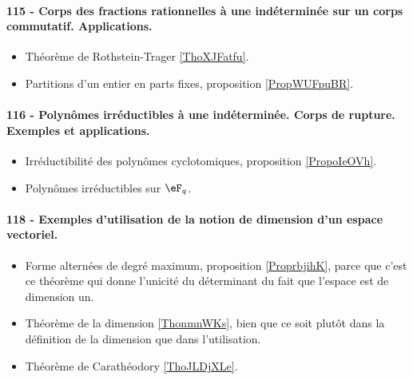 \paragraph{115 - Corps des fractions rationnelles à une indéterminée sur un corps commutatif. Applications.}
\begin{itemize}
    \item Théorème de Rothstein-Trager \ref{ThoXJFatfu}.
    \item Partitions d'un entier en parts fixes, proposition \ref{PropWUFpuBR}.
\end{itemize}

\paragraph{116 - Polynômes irréductibles à une indéterminée. Corps de rupture. Exemples et applications.}
\begin{itemize}
    \item Irréductibilité des polynômes cyclotomiques, proposition \ref{PropoIeOVh}.
    \item Polynômes irréductibles sur \( \eF_q\).
\end{itemize}
\paragraph{118 - Exemples d’utilisation de la notion de dimension d’un espace vectoriel.}
\begin{itemize}
    \item Forme alternées de degré maximum, proposition \ref{ProprbjihK}, parce que c'est ce théorème qui donne l'unicité du déterminant du fait que l'espace est de dimension un.
    \item Théorème de la dimension \ref{ThonmnWKs}, bien que ce soit plutôt dans la définition de la dimension que dans l'utilisation.
    \item Théorème de Carathéodory \ref{ThoJLDjXLe}.
\end{itemize}

